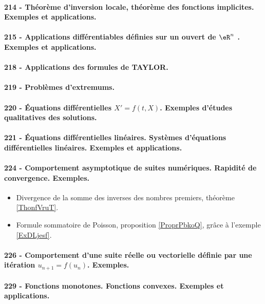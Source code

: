 \paragraph{214 - Théorème d’inversion locale, théorème des fonctions implicites. Exemples et applications.}
\paragraph{215 - Applications différentiables définies sur un ouvert de $\eR^n$ . Exemples et applications.}
\paragraph{218 - Applications des formules de TAYLOR.}
\paragraph{219 - Problèmes d’extremums.}
\paragraph{220 - Équations différentielles $X' = f (t , X )$. Exemples d’études qualitatives des solutions.}
\paragraph{221 - Équations différentielles linéaires. Systèmes d’équations différentielles linéaires. Exemples et applications.}
\paragraph{224 - Comportement asymptotique de suites numériques. Rapidité de convergence. Exemples.}
\begin{itemize}
    \item Divergence de la somme des inverses des nombres premiers, théorème \ref{ThonfVruT}.
    \item Formule sommatoire de Poisson, proposition \ref{ProprPbkoQ}, grâce à l'exemple \ref{ExDLjesf}.
\end{itemize}
\paragraph{226 - Comportement d’une suite réelle ou vectorielle définie par une itération \( u_{n+1}=f(u_n)\). Exemples.}
\paragraph{229 - Fonctions monotones. Fonctions convexes. Exemples et applications.}
